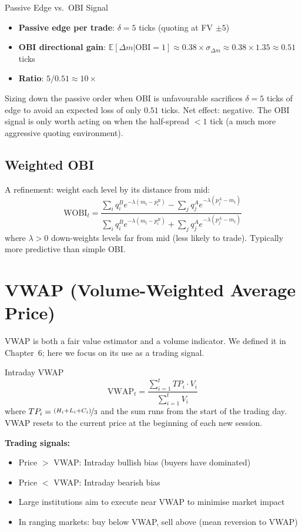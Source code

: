 \documentclass[12pt,a4paper,openany]{report}
\theoremstyle{definition}
\newcommand{\E}{\mathbb{E}}
\begin{document}
\begin{keyconceptbox}{Passive Edge vs.\ OBI Signal}
\begin{itemize}
  \item \textbf{Passive edge per trade}: $\delta = 5$ ticks (quoting at FV $\pm 5$)
  \item \textbf{OBI directional gain}: $\E[\Delta m | \text{OBI} = 1] \approx 0.38 \times \sigma_{\Delta m} \approx 0.38 \times 1.35 \approx 0.51$ ticks
  \item \textbf{Ratio}: $5 / 0.51 \approx 10\times$
\end{itemize}
Sizing down the passive order when OBI is unfavourable sacrifices $\delta = 5$ ticks of edge to avoid an expected loss of only $0.51$ ticks. Net effect: negative. The OBI signal is only worth acting on when the half-spread $< 1$ tick (a much more aggressive quoting environment).
\end{keyconceptbox}

\subsection{Weighted OBI}

A refinement: weight each level by its distance from mid:
\[
  \text{WOBI}_t = \frac{\sum_i q_i^B e^{-\lambda(m_t - p_i^B)} - \sum_j q_j^A e^{-\lambda(p_j^A - m_t)}}{\sum_i q_i^B e^{-\lambda(m_t - p_i^B)} + \sum_j q_j^A e^{-\lambda(p_j^A - m_t)}}
\]
where $\lambda > 0$ down-weights levels far from mid (less likely to trade). Typically more predictive than simple OBI.

\section{VWAP (Volume-Weighted Average Price)}

VWAP is both a fair value estimator and a volume indicator. We defined it in Chapter~6; here we focus on its use as a trading signal.

\begin{definitionbox}{Intraday VWAP}
\[
  \text{VWAP}_t = \frac{\sum_{i=1}^{t} TP_i \cdot V_i}{\sum_{i=1}^{t} V_i}
\]
where $TP_i = \nicefrac{(H_i+L_i+C_i)}{3}$ and the sum runs from the start of the trading day. VWAP resets to the current price at the beginning of each new session.
\end{definitionbox}

\textbf{Trading signals:}
\begin{itemize}
  \item Price $>$ VWAP: Intraday bullish bias (buyers have dominated)
  \item Price $<$ VWAP: Intraday bearish bias
  \item Large institutions aim to execute near VWAP to minimise market impact
  \item In ranging markets: buy below VWAP, sell above (mean reversion to VWAP)
\end{itemize}
\end{document}
